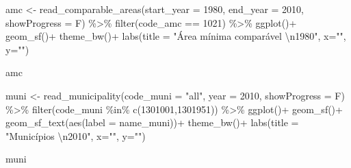 \documentclass[
  brazilian,
]{book}
\newenvironment{Shaded}{\begin{snugshade}}{\end{snugshade}}
\newcommand{\AttributeTok}[1]{\textcolor[rgb]{0.77,0.63,0.00}{#1}}
\newcommand{\DecValTok}[1]{\textcolor[rgb]{0.00,0.00,0.81}{#1}}
\newcommand{\FunctionTok}[1]{\textcolor[rgb]{0.00,0.00,0.00}{#1}}
\newcommand{\NormalTok}[1]{#1}
\newcommand{\OtherTok}[1]{\textcolor[rgb]{0.56,0.35,0.01}{#1}}
\newcommand{\SpecialCharTok}[1]{\textcolor[rgb]{0.00,0.00,0.00}{#1}}
\newcommand{\StringTok}[1]{\textcolor[rgb]{0.31,0.60,0.02}{#1}}
\begin{document}
\begin{Shaded}
\begin{Highlighting}[]
\NormalTok{amc }\OtherTok{\textless{}{-}} \FunctionTok{read\_comparable\_areas}\NormalTok{(}\AttributeTok{start\_year =} \DecValTok{1980}\NormalTok{,}
                             \AttributeTok{end\_year =} \DecValTok{2010}\NormalTok{,}
                             \AttributeTok{showProgress =}\NormalTok{ F) }\SpecialCharTok{\%\textgreater{}\%} 
  \FunctionTok{filter}\NormalTok{(code\_amc }\SpecialCharTok{==} \DecValTok{1021}\NormalTok{) }\SpecialCharTok{\%\textgreater{}\%} 
  \FunctionTok{ggplot}\NormalTok{()}\SpecialCharTok{+}
  \FunctionTok{geom\_sf}\NormalTok{()}\SpecialCharTok{+}
  \FunctionTok{theme\_bw}\NormalTok{()}\SpecialCharTok{+}
  \FunctionTok{labs}\NormalTok{(}\AttributeTok{title =} \StringTok{"Área mínima comparável }\SpecialCharTok{\textbackslash{}n}\StringTok{1980"}\NormalTok{, }\AttributeTok{x=}\StringTok{""}\NormalTok{, }\AttributeTok{y=}\StringTok{""}\NormalTok{)}


\NormalTok{amc}
\end{Highlighting}
\end{Shaded}

\begin{Shaded}
\begin{Highlighting}[]
\NormalTok{muni }\OtherTok{\textless{}{-}} \FunctionTok{read\_municipality}\NormalTok{(}\AttributeTok{code\_muni =} \StringTok{"all"}\NormalTok{,}
                          \AttributeTok{year =} \DecValTok{2010}\NormalTok{,}
                          \AttributeTok{showProgress =}\NormalTok{ F) }\SpecialCharTok{\%\textgreater{}\%}
  \FunctionTok{filter}\NormalTok{(code\_muni }\SpecialCharTok{\%in\%} \FunctionTok{c}\NormalTok{(}\DecValTok{1301001}\NormalTok{,}\DecValTok{1301951}\NormalTok{)) }\SpecialCharTok{\%\textgreater{}\%} 
  \FunctionTok{ggplot}\NormalTok{()}\SpecialCharTok{+}
  \FunctionTok{geom\_sf}\NormalTok{()}\SpecialCharTok{+}
  \FunctionTok{geom\_sf\_text}\NormalTok{(}\FunctionTok{aes}\NormalTok{(}\AttributeTok{label =}\NormalTok{ name\_muni))}\SpecialCharTok{+}
  \FunctionTok{theme\_bw}\NormalTok{()}\SpecialCharTok{+}
  \FunctionTok{labs}\NormalTok{(}\AttributeTok{title =} \StringTok{"Municípios }\SpecialCharTok{\textbackslash{}n}\StringTok{2010"}\NormalTok{, }\AttributeTok{x=}\StringTok{""}\NormalTok{, }\AttributeTok{y=}\StringTok{""}\NormalTok{)}

\NormalTok{muni}
\end{Highlighting}
\end{Shaded}
\end{document}
